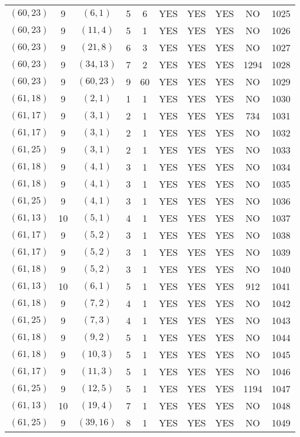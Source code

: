 \begin{longtable}{|c|c|c|c|c|c|c|c|c|c|}
$(60, 23)$ & 9 & $(6, 1)$ & 5 & 6 & YES & YES & YES & NO & 1025\\
$(60, 23)$ & 9 & $(11, 4)$ & 5 & 1 & YES & YES & YES & NO & 1026\\
$(60, 23)$ & 9 & $(21, 8)$ & 6 & 3 & YES & YES & YES & NO & 1027\\
$(60, 23)$ & 9 & $(34, 13)$ & 7 & 2 & YES & YES & YES & 1294 & 1028\\
$(60, 23)$ & 9 & $(60, 23)$ & 9 & 60 & YES & YES & YES & NO & 1029\\
$(61, 18)$ & 9 & $(2, 1)$ & 1 & 1 & YES & YES & YES & NO & 1030\\
$(61, 17)$ & 9 & $(3, 1)$ & 2 & 1 & YES & YES & YES & 734 & 1031\\
$(61, 17)$ & 9 & $(3, 1)$ & 2 & 1 & YES & YES & YES & NO & 1032\\
$(61, 25)$ & 9 & $(3, 1)$ & 2 & 1 & YES & YES & YES & NO & 1033\\
$(61, 18)$ & 9 & $(4, 1)$ & 3 & 1 & YES & YES & YES & NO & 1034\\
$(61, 18)$ & 9 & $(4, 1)$ & 3 & 1 & YES & YES & YES & NO & 1035\\
$(61, 25)$ & 9 & $(4, 1)$ & 3 & 1 & YES & YES & YES & NO & 1036\\
$(61, 13)$ & 10 & $(5, 1)$ & 4 & 1 & YES & YES & YES & NO & 1037\\
$(61, 17)$ & 9 & $(5, 2)$ & 3 & 1 & YES & YES & YES & NO & 1038\\
$(61, 17)$ & 9 & $(5, 2)$ & 3 & 1 & YES & YES & YES & NO & 1039\\
$(61, 18)$ & 9 & $(5, 2)$ & 3 & 1 & YES & YES & YES & NO & 1040\\
$(61, 13)$ & 10 & $(6, 1)$ & 5 & 1 & YES & YES & YES & 912 & 1041\\
$(61, 18)$ & 9 & $(7, 2)$ & 4 & 1 & YES & YES & YES & NO & 1042\\
$(61, 25)$ & 9 & $(7, 3)$ & 4 & 1 & YES & YES & YES & NO & 1043\\
$(61, 18)$ & 9 & $(9, 2)$ & 5 & 1 & YES & YES & YES & NO & 1044\\
$(61, 18)$ & 9 & $(10, 3)$ & 5 & 1 & YES & YES & YES & NO & 1045\\
$(61, 17)$ & 9 & $(11, 3)$ & 5 & 1 & YES & YES & YES & NO & 1046\\
$(61, 25)$ & 9 & $(12, 5)$ & 5 & 1 & YES & YES & YES & 1194 & 1047\\
$(61, 13)$ & 10 & $(19, 4)$ & 7 & 1 & YES & YES & YES & NO & 1048\\
$(61, 25)$ & 9 & $(39, 16)$ & 8 & 1 & YES & YES & YES & NO & 1049\\

\end{longtable}
